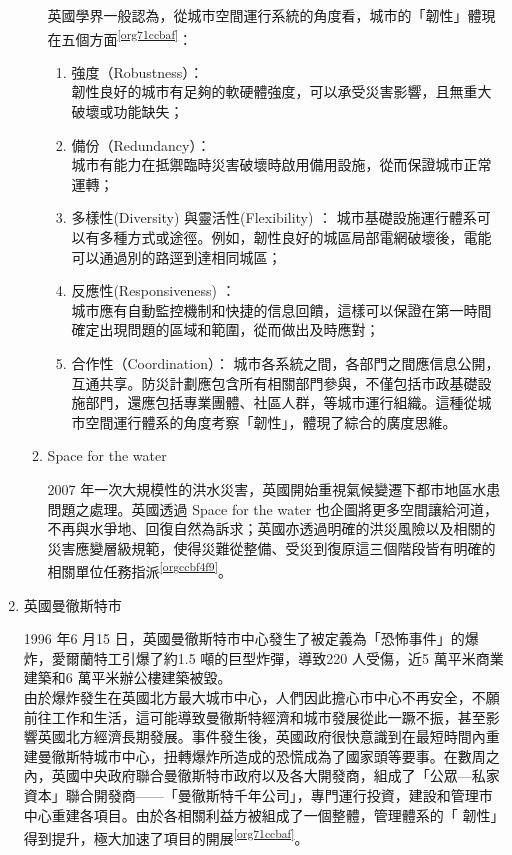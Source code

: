 \documentclass[a4paper,12pt]{article}
\begin{document}
\begin{enumerate}
\begin{enumerate}
英國學界一般認為，從城市空間運行系統的角度看，城市的「韌性」體現在五個方面\textsuperscript{\ref{org71ccbaf}}：\\
\begin{enumerate}
\item 強度（Robustness）：\\
韌性良好的城市有足夠的軟硬體強度，可以承受災害影響，且無重大破壞或功能缺失；\\
\item 備份（Redundancy）：\\
城市有能力在抵禦臨時災害破壞時啟用備用設施，從而保證城市正常運轉；\\
\item 多樣性(Diversity) 與靈活性(Flexibility) ： 城市基礎設施運行體系可以有多種方式或途徑。例如，韌性良好的城區局部電網破壞後，電能可以通過別的路逕到達相同城區；\\
\item 反應性(Responsiveness) ：\\
城市應有自動監控機制和快捷的信息回饋，這樣可以保證在第一時間確定出現問題的區域和範圍，從而做出及時應對；\\
\item 合作性（Coordination）：   城市各系統之間，各部門之間應信息公開，互通共享。防災計劃應包含所有相關部門參與，不僅包括市政基礎設施部門，還應包括專業團體、社區人群，等城市運行組織。這種從城市空間運行體系的角度考察「韌性」，體現了綜合的廣度思維。\\
\end{enumerate}

\item Space for the water
\label{sec:org78ac459}

2007 年一次大規模性的洪水災害，英國開始重視氣候變遷下都市地區水患問題之處理。英國透過 Space for the water 也企圖將更多空間讓給河道，不再與水爭地、回復自然為訴求；英國亦透過明確的洪災風險以及相關的災害應變層級規範，使得災難從整備、受災到復原這三個階段皆有明確的相關單位任務指派\textsuperscript{\ref{orgccbf4f9}}。\\
\end{enumerate}

\item 英國曼徹斯特市
\label{sec:orge094af4}

1996 年6 月15 日，英國曼徹斯特市中心發生了被定義為「恐怖事件」的爆炸，愛爾蘭特工引爆了約1.5 噸的巨型炸彈，導致220 人受傷，近5 萬平米商業建築和6 萬平米辦公樓建築被毀。\\

由於爆炸發生在英國北方最大城市中心，人們因此擔心市中心不再安全，不願前往工作和生活，這可能導致曼徹斯特經濟和城市發展從此一蹶不振，甚至影響英國北方經濟長期發展。事件發生後，英國政府很快意識到在最短時間內重建曼徹斯特城市中心，扭轉爆炸所造成的恐慌成為了國家頭等要事。在數周之內，英國中央政府聯合曼徹斯特市政府以及各大開發商，組成了「公眾—私家資本」聯合開發商——「曼徹斯特千年公司」，專門運行投資，建設和管理市中心重建各項目。由於各相關利益方被組成了一個整體，管理體系的「 韌性」得到提升，極大加速了項目的開展\textsuperscript{\ref{org71ccbaf}}。\\


\end{enumerate}
\end{document}
